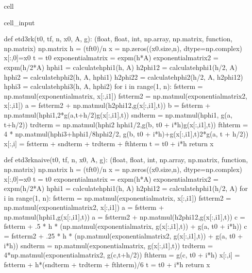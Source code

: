\documentclass[letterpaper,10pt,english]{jupyterBook}
\begin{document}
\begin{sphinxuseclass}{cell}
\begin{sphinxVerbatimInput}
\begin{sphinxuseclass}{cell_input}
\begin{sphinxVerbatim}[commandchars=\\\{\}]
def etd3rk(t0, tf, n, x0, A, g):
  \PYGZsq{}\PYGZsq{}\PYGZsq{}(float, float, int, np.array, np.matrix, function, np.matrix) \PYGZhy{}\PYGZgt{} np.matrix\PYGZsq{}\PYGZsq{}\PYGZsq{}
  h = (tf\PYGZhy{}t0)/n
  x = np.zeros((x0.size,n), dtype=np.complex\PYGZus{})
  x[:,0]=x0
  t = t0
  exponential\PYGZus{}matrix = expm(\PYGZhy{}h*A)
  exponential\PYGZus{}matrix\PYGZus{}2 = expm(\PYGZhy{}h/2*A)
  hphi1 = calculate\PYGZus{}hphi1(h, A)
  h\PYGZus{}2phi1\PYGZus{}2 = calculate\PYGZus{}hphi1(h/2, A)
  hphi2 = calculate\PYGZus{}hphi2(h, A, hphi1)
  h\PYGZus{}2phi2\PYGZus{}2 = calculate\PYGZus{}hphi2(h/2, A, h\PYGZus{}2phi1\PYGZus{}2)
  hphi3 = calculate\PYGZus{}hphi3(h, A, hphi2)
  for i in range(1, n):
    fst\PYGZus{}term = np.matmul(exponential\PYGZus{}matrix, x[:,i\PYGZhy{}1])
    fst\PYGZus{}term\PYGZus{}2 = np.matmul(exponential\PYGZus{}matrix\PYGZus{}2, x[:,i\PYGZhy{}1])
    a = fst\PYGZus{}term\PYGZus{}2 + np.matmul(h\PYGZus{}2phi1\PYGZus{}2,g(x[:,i\PYGZhy{}1],t))
    b = fst\PYGZus{}term + np.matmul(hphi1,2*g(a,t+h/2)\PYGZhy{}g(x[:,i\PYGZhy{}1],t))
    snd\PYGZus{}term = np.matmul(hphi1, g(a, t+h/2))
    trd\PYGZus{}term = np.matmul(hphi2 \PYGZhy{} hphi1/2,g(b, t0 + i*h)\PYGZhy{}g(x[:,i\PYGZhy{}1],t))
    fth\PYGZus{}term = 4 * np.matmul(hphi3+hphi1/8\PYGZhy{}hphi2/2, g(b, t0 + i*h)+g(x[:,i\PYGZhy{}1],t)\PYGZhy{}2*g(a, t + h/2))
    x[:,i] = fst\PYGZus{}term + snd\PYGZus{}term + trd\PYGZus{}term + fth\PYGZus{}term
    t = t0 + i*h
  return x

def etd3rk\PYGZus{}naive(t0, tf, n, x0, A, g):
  \PYGZsq{}\PYGZsq{}\PYGZsq{}(float, float, int, np.array, np.matrix, function, np.matrix) \PYGZhy{}\PYGZgt{} np.matrix\PYGZsq{}\PYGZsq{}\PYGZsq{}
  h = (tf\PYGZhy{}t0)/n
  x = np.zeros((x0.size,n), dtype=np.complex\PYGZus{})
  x[:,0]=x0
  t = t0
  exponential\PYGZus{}matrix = expm(\PYGZhy{}h*A)
  exponential\PYGZus{}matrix\PYGZus{}2 = expm(\PYGZhy{}h/2*A)
  hphi1 = calculate\PYGZus{}hphi1(h, A)
  h\PYGZus{}2phi1\PYGZus{}2 = calculate\PYGZus{}hphi1(h/2, A)
  for i in range(1, n):
    fst\PYGZus{}term = np.matmul(exponential\PYGZus{}matrix, x[:,i\PYGZhy{}1])
    fst\PYGZus{}term\PYGZus{}2 = np.matmul(exponential\PYGZus{}matrix\PYGZus{}2, x[:,i\PYGZhy{}1])
    a = fst\PYGZus{}term + np.matmul(hphi1,g(x[:,i\PYGZhy{}1],t))
    a\PYGZus{} = fst\PYGZus{}term\PYGZus{}2 + np.matmul(h\PYGZus{}2phi1\PYGZus{}2,g(x[:,i\PYGZhy{}1],t))
    c = fst\PYGZus{}term + .5 * h * (np.matmul(exponential\PYGZus{}matrix, g(x[:,i\PYGZhy{}1],t)) + g(a, t0 + i*h))
    c\PYGZus{} = fst\PYGZus{}term\PYGZus{}2 + .25 * h * (np.matmul(exponential\PYGZus{}matrix\PYGZus{}2, g(x[:,i\PYGZhy{}1],t)) + g(a\PYGZus{}, t0 + i*h))
    snd\PYGZus{}term = np.matmul(exponential\PYGZus{}matrix, g(x[:,i\PYGZhy{}1],t))
    trd\PYGZus{}term = 4*np.matmul(exponential\PYGZus{}matrix\PYGZus{}2, g(c\PYGZus{},t+h/2))
    fth\PYGZus{}term = g(c, t0 + i*h)
    x[:,i] = fst\PYGZus{}term + h*(snd\PYGZus{}term + trd\PYGZus{}term + fth\PYGZus{}term)/6
    t = t0 + i*h
  return x


\end{sphinxVerbatim}
\end{sphinxuseclass}
\end{sphinxVerbatimInput}
\end{sphinxuseclass}
\end{document}
